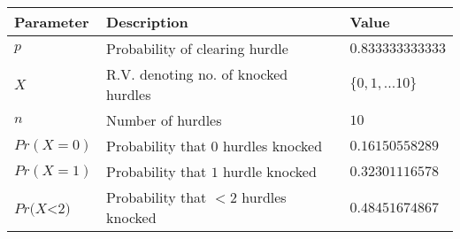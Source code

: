 \begin{tabular}{|l|l|l|}\hline
Parameter	&Description	&Value\\ \hline
$p$	&Probability of clearing hurdle	&$0.833333333333$\\ \hline
$X$	&R.V. denoting no. of knocked hurdles	&$\{0, 1, ... 10\}$\\ \hline
$n$	&Number of hurdles	&$10$\\ \hline
$Pr (X = 0)$	&Probability that 0 hurdles knocked	&$0.16150558289$\\ \hline
$Pr (X = 1)$	&Probability that $1$ hurdle knocked	&$0.32301116578$\\ \hline
$Pr (X $<$  2)$	&Probability that $< 2$ hurdles knocked	&$0.48451674867$\\ \hline
\end{tabular}
